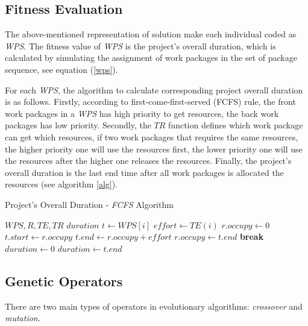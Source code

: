 \subsection{Fitness Evaluation}
%
The above-mentioned representation of solution make each individual coded as
\emph{WPS}. The fitness value of \emph{WPS} is the project's overall duration,
which is calculated by simulating the assignment of work packages in the set of
package sequence, see equation (\ref{wps}).

For each \emph{WPS}, the algorithm to calculate corresponding project overall
duration is as follows. Firstly, according to first-come-first-served (FCFS)
rule, the front work packages in a \emph{WPS} has high priority to get
resources, the back work packages has low priority. Secondly, the $TR$ function
defines which work package can get which resources, if two work packages that
requires the same resources, the higher priority one will use the resources
first, the lower priority one will use the resources after the higher one
releases the resources. Finally, the project's overall duration is the last end
time after all work packages is allocated the resources (see algorithm
\ref{alg}).


\begin{algorithm}
  \caption{Project's Overall Duration - \emph{FCFS} Algorithm}
  \label{alg}
  \begin{algorithmic}
    \REQUIRE $WPS, R, TE, TR$
    \ENSURE $duration$
      \STATE $t \gets WPS[i]$
      \STATE $ effort \gets TE(i)$
        \STATE $r.occupy \gets 0$
      \ENDFOR 
          \STATE $t.start \gets r.occupy$
          \STATE $t.end \gets r.occupy + effort$
          \STATE $r.occupy \gets t.end$
          \STATE \textbf{break}
        \ENDIF
      \ENDFOR
    \ENDFOR
    \STATE $duration \gets 0$  
        \STATE $duration \gets t.end$
      \ENDIF
    \ENDFOR
  \end{algorithmic}
\end{algorithm}

\subsection{Genetic Operators}
%

There are two main types of operators in evolutionary algorithms:
\emph{crossover} and \emph{mutation}.

